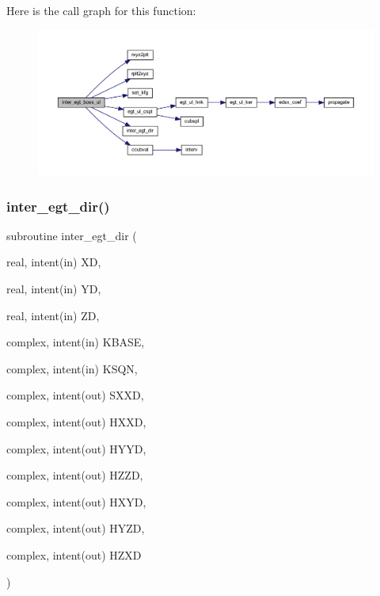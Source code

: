 Here is the call graph for this function\+:\nopagebreak
\begin{figure}[H]
\begin{center}
\leavevmode
\includegraphics[width=350pt]{Leroi__c_8f90_ae92f09c8cb5ab0bcf37a78e555f55025_cgraph}
\end{center}
\end{figure}
\mbox{\label{Leroi__c_8f90_ab648c76e3422d73a3d9c0530c4a77dd5}} 
\subsubsection{\texorpdfstring{inter\+\_\+egt\+\_\+dir()}{inter\_egt\_dir()}}
{\footnotesize\ttfamily subroutine inter\+\_\+egt\+\_\+dir (\begin{DoxyParamCaption}\item[{real, intent(in)}]{XD,  }\item[{real, intent(in)}]{YD,  }\item[{real, intent(in)}]{ZD,  }\item[{complex, intent(in)}]{K\+B\+A\+SE,  }\item[{complex, intent(in)}]{K\+S\+QN,  }\item[{complex, intent(out)}]{S\+X\+XD,  }\item[{complex, intent(out)}]{H\+X\+XD,  }\item[{complex, intent(out)}]{H\+Y\+YD,  }\item[{complex, intent(out)}]{H\+Z\+ZD,  }\item[{complex, intent(out)}]{H\+X\+YD,  }\item[{complex, intent(out)}]{H\+Y\+ZD,  }\item[{complex, intent(out)}]{H\+Z\+XD }\end{DoxyParamCaption})}


